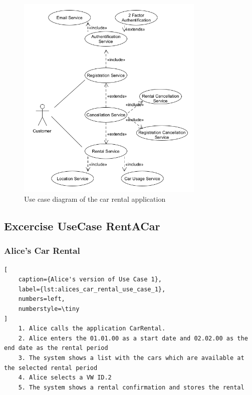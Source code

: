 \begin{figure}
    \centering
    \includegraphics[width=0.8\textwidth]{figures/goLang/carRental/carRental_umlDiagram.png}
    \caption{Use case diagram of the car rental application}
    \label{fig:car_rental_use_case_diagram}
\end{figure}

\subsection{Excercise UseCase RentACar}
\label{sec:exercise_use_case_rent_a_car}
\subsubsection*{Alice's Car Rental}
\begin{lstlisting}[
    caption={Alice's version of Use Case 1},
    label={lst:alices_car_rental_use_case_1},
    numbers=left,
    numberstyle=\tiny
]
    1. Alice calls the application CarRental.
    2. Alice enters the 01.01.00 as a start date and 02.02.00 as the end date as the rental period
    3. The system shows a list with the cars which are available at the selected rental period
    4. Alice selects a VW ID.2
    5. The system shows a rental confirmation and stores the rental
\end{lstlisting}
